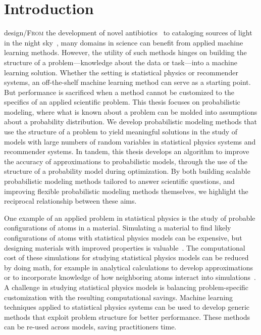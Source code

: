 \chapter{Introduction}\label{ch:intro}
\lettrine[image=true,lines=3]{design/F}{rom} the development of novel antibiotics~\citep{stokes2020a-deep} to cataloging sources of light in the night sky~\citep{regier2019cataloging}, many domains in science can benefit from applied machine learning methods. However, the utility of such methods hinges on building the structure of a problem---knowledge about the data or task---into a machine learning solution. Whether the setting is statistical physics or recommender systems, an off-the-shelf machine learning method can serve as a starting point. But performance is sacrificed when a method cannot be customized to the specifics of an applied scientific problem. This thesis focuses on probabilistic modeling, where what is known about a problem can be molded into assumptions about a probability distribution. We develop probabilistic modeling methods that use the structure of a problem to yield meaningful solutions in the study of models with large numbers of random variables in statistical physics systems and recommender systems. In tandem, this thesis develops an algorithm to improve the accuracy of approximations to probabilistic models, through the use of the structure of a probability model during optimization. By both building scalable probabilistic modeling methods tailored to answer scientific questions, and improving flexible probabilistic modeling methods themselves, we highlight the reciprocal relationship between these aims.%

One example of an applied problem in statistical physics is the study of probable configurations of atoms in a material. Simulating a material to find likely configurations of atoms with statistical physics models can be expensive, but designing materials with improved properties is valuable~\citep{schmidt2019recent}. The computational cost of these simulations for studying statistical physics models can be reduced by doing math, for example in analytical calculations to develop approximations or to incorporate knowledge of how neighboring atoms interact into simulations~\citep{swendsen1987nonuniversal}. A challenge in studying statistical physics models is balancing problem-specific customization with the resulting computational savings. Machine learning techniques applied to statistical physics systems can be used to develop generic methods that exploit problem structure for better performance. These methods can be re-used across models, saving practitioners time.

